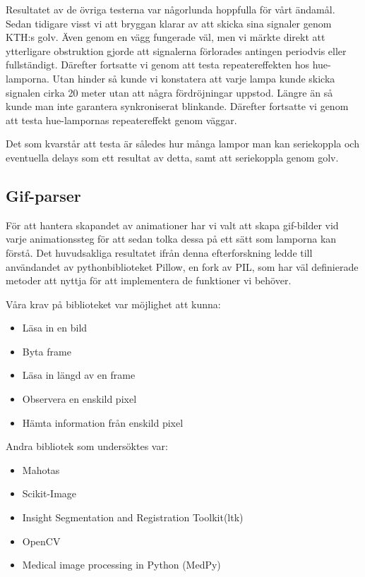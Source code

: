 \documentclass[a4paper,11pt]{article}
\begin{document}
   Resultatet av de övriga testerna var någorlunda hoppfulla för vårt ändamål.
   Sedan tidigare visst vi att bryggan klarar av att skicka sina signaler genom
   KTH:s golv. Även genom en vägg fungerade väl, men vi märkte direkt att
   ytterligare obstruktion gjorde att signalerna förlorades antingen periodvis
   eller fullständigt.
   Därefter fortsatte vi genom att testa repeatereffekten hos hue-lamporna. 
   Utan hinder så kunde vi konstatera att varje lampa kunde skicka signalen
   cirka 20 meter utan att några fördröjningar uppstod. Längre än så kunde man
   inte garantera synkroniserat blinkande.
   Därefter fortsatte vi genom att testa hue-lampornas repeatereffekt genom
   väggar.

   Det som kvarstår att testa är således hur många lampor man kan seriekoppla 
   och eventuella delays som ett resultat av detta, samt att seriekoppla genom 
   golv.

\subsection{Gif-parser}

   För att hantera skapandet av animationer har vi valt att skapa gif-bilder
   vid varje animationssteg för att sedan tolka dessa på ett sätt som
   lamporna kan förstå. Det huvudsakliga resultatet ifrån denna efterforskning
   ledde till användandet av pythonbiblioteket Pillow, en fork av PIL, som har
   väl definierade metoder att nyttja för att implementera de funktioner
   vi behöver.

   Våra krav på biblioteket var möjlighet att kunna:

   \begin{itemize}
     \item Läsa in en bild
     \item Byta frame
     \item Läsa in längd av en frame
     \item Observera en enskild pixel
     \item Hämta information från enskild pixel
   \end{itemize}

   Andra bibliotek som undersöktes var:

   \begin{itemize}
     \item Mahotas
     \item Scikit-Image
     \item Insight Segmentation and Registration Toolkit(ltk) 
     \item OpenCV
     \item Medical image processing in Python (MedPy)
   \end{itemize}
\end{document}
